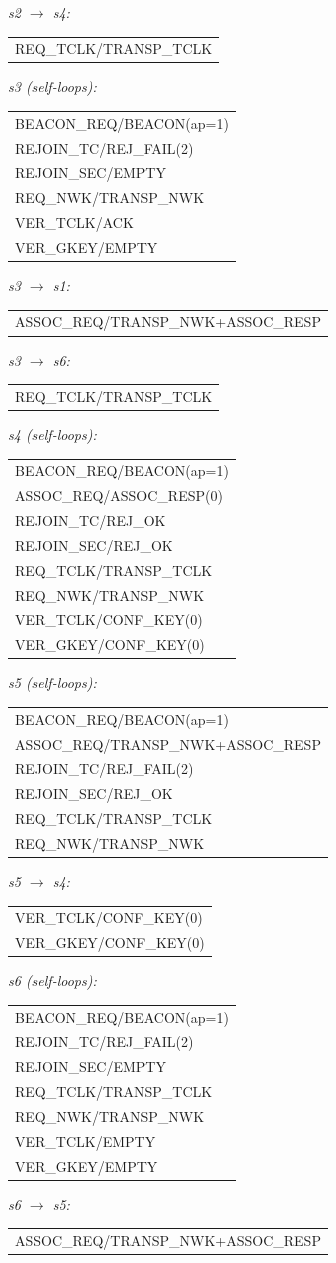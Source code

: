 \documentclass[10pt]{article}
\makeatletter
\newcommand{\iolist}[1]{%
  \ttfamily\small
  \begin{tabular}{@{}l@{}}
  #1
  \end{tabular}%
  \rmfamily
}
\makeatother
\begin{document}
\medskip
\noindent\textit{s2 $\to$ s4:}\\[2pt]
\iolist{%
REQ\_TCLK/TRANSP\_TCLK\\
}

\medskip
\noindent\textit{s3 (self-loops):}\\[2pt]
\iolist{%
BEACON\_REQ/BEACON(ap=1)\\
REJOIN\_TC/REJ\_FAIL(2)\\
REJOIN\_SEC/EMPTY\\
REQ\_NWK/TRANSP\_NWK\\
VER\_TCLK/ACK\\
VER\_GKEY/EMPTY\\
}

\medskip
\noindent\textit{s3 $\to$ s1:}\\[2pt]
\iolist{%
ASSOC\_REQ/TRANSP\_NWK+ASSOC\_RESP\\
}

\medskip
\noindent\textit{s3 $\to$ s6:}\\[2pt]
\iolist{%
REQ\_TCLK/TRANSP\_TCLK\\
}

\medskip
\noindent\textit{s4 (self-loops):}\\[2pt]
\iolist{%
BEACON\_REQ/BEACON(ap=1)\\
ASSOC\_REQ/ASSOC\_RESP(0)\\
REJOIN\_TC/REJ\_OK\\
REJOIN\_SEC/REJ\_OK\\
REQ\_TCLK/TRANSP\_TCLK\\
REQ\_NWK/TRANSP\_NWK\\
VER\_TCLK/CONF\_KEY(0)\\
VER\_GKEY/CONF\_KEY(0)\\
}

\medskip
\noindent\textit{s5 (self-loops):}\\[2pt]
\iolist{%
BEACON\_REQ/BEACON(ap=1)\\
ASSOC\_REQ/TRANSP\_NWK+ASSOC\_RESP\\
REJOIN\_TC/REJ\_FAIL(2)\\
REJOIN\_SEC/REJ\_OK\\
REQ\_TCLK/TRANSP\_TCLK\\
REQ\_NWK/TRANSP\_NWK\\
}

\medskip
\noindent\textit{s5 $\to$ s4:}\\[2pt]
\iolist{%
VER\_TCLK/CONF\_KEY(0)\\
VER\_GKEY/CONF\_KEY(0)\\
}

\medskip
\noindent\textit{s6 (self-loops):}\\[2pt]
\iolist{%
BEACON\_REQ/BEACON(ap=1)\\
REJOIN\_TC/REJ\_FAIL(2)\\
REJOIN\_SEC/EMPTY\\
REQ\_TCLK/TRANSP\_TCLK\\
REQ\_NWK/TRANSP\_NWK\\
VER\_TCLK/EMPTY\\
VER\_GKEY/EMPTY\\
}

\medskip
\noindent\textit{s6 $\to$ s5:}\\[2pt]
\iolist{%
ASSOC\_REQ/TRANSP\_NWK+ASSOC\_RESP\\
}
\end{document}

